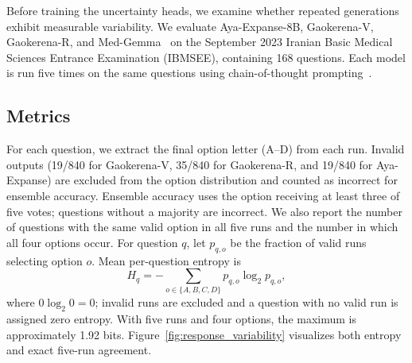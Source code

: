\documentclass[conference,a4paper]{IEEEtran}
\begin{document}
Before training the uncertainty heads, we examine whether repeated generations exhibit measurable variability. We evaluate Aya-Expanse-8B, Gaokerena-V, Gaokerena-R, and Med-Gemma~\cite{b11} on the September 2023 Iranian Basic Medical Sciences Entrance Examination (IBMSEE), containing 168 questions. Each model is run five times on the same questions using chain-of-thought prompting~\cite{b12}.

\subsection{Metrics}
For each question, we extract the final option letter (A--D) from each run. Invalid outputs (19/840 for Gaokerena-V, 35/840 for Gaokerena-R, and 19/840 for Aya-Expanse) are excluded from the option distribution and counted as incorrect for ensemble accuracy. Ensemble accuracy uses the option receiving at least three of five votes; questions without a majority are incorrect. We also report the number of questions with the same valid option in all five runs and the number in which all four options occur. For question $q$, let $p_{q,o}$ be the fraction of valid runs selecting option $o$. Mean per-question entropy is
\begin{equation}
H_q=-\sum_{o\in\{A,B,C,D\}}p_{q,o}\log_2 p_{q,o},
\end{equation}
where $0\log_2 0=0$; invalid runs are excluded and a question with no valid run is assigned zero entropy. With five runs and four options, the maximum is approximately 1.92 bits. Figure~\ref{fig:response_variability} visualizes both entropy and exact five-run agreement.
\end{document}
